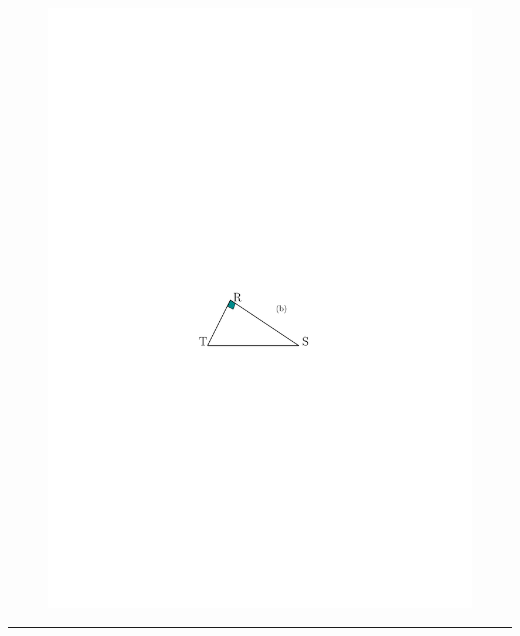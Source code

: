 \documentclass[12pt]{article}
\newcommand{\horrule}[1]{\rule{\linewidth}{#1}} %
\begin{document}
\begin{multicols}{3}
  \begin{figure}[H]
    \centering
    \includegraphics[width=0.7\linewidth]{sources/1/exo1-tri-2.pdf}
  \end{figure}
  
\end{multicols}

\horrule{1px}
\end{document}
